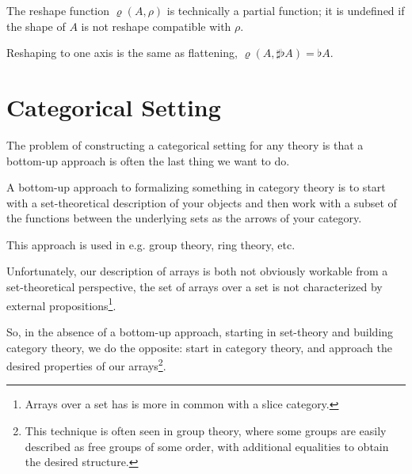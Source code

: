 \documentclass{DIKU-report-variant}
\begin{document}
\begin{remark}
  \label{def:rho-func}
  The reshape function \(\varrho(A, \rho)\) is technically a partial function; it is
  undefined if the shape of \(A\) is not reshape compatible with \(\rho\).

  Reshaping to one axis is the same as flattening, \(\varrho(A, \sharp \flat A) = \flat A\).
\end{remark}

\section{Categorical Setting}

The problem of constructing a categorical setting for any theory
is that a bottom-up approach is often the last thing we want to do.

A bottom-up approach to formalizing something in category theory is to
start with a set-theoretical description of your objects
and then work with a subset of the functions between the underlying sets as
the arrows of your category.

This approach is used in e.g. group theory, ring theory, etc.

Unfortunately, our description of arrays is both not obviously workable from a
set-theoretical perspective, the set of arrays over a set is not characterized by
external propositions\footnote{Arrays over a set has is more in common with a slice category.}.

So, in the absence of a bottom-up approach, starting in set-theory and building category theory,
we do the opposite: start in category theory, and approach the desired properties of our arrays\footnote{This technique is often seen in group theory, where some groups are easily described as
free groups of some order, with additional equalities to obtain the desired structure.}.
\end{document}

